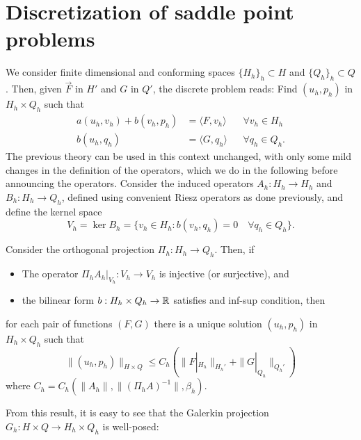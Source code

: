 \section{Discretization of saddle point problems}\label{sec:discretization-saddle-point}
We consider finite dimensional and conforming spaces $\{H_h\}_h \subset H$ and $\{Q_h\}_h \subset Q$. Then, given $\vec F$ in $H'$ and $G$ in $Q'$, the discrete problem reads: Find $(u_h, p_h)$ in $H_h \times Q_h$ such that 
\begin{equation}
    \begin{aligned}
        a(u_h, v_h) + b(v_h, p_h) &= \langle F, v_h\rangle &&\forall v_h \in H_h \\
        b(u_h, q_h)  &= \langle G, q_h\rangle &&\forall q_h \in Q_h. 
    \end{aligned}
\end{equation}
The previous theory can be used in this context unchanged, with only some mild changes in the definition of the operators, which we do in the following before announcing the operators. Consider the induced operators $A_h:H_h\to H_h$ and $B_h: H_h\to Q_h$, defined using convenient Riesz operators as done previously, and define the kernel space 
\begin{equation}
    V_h = \ker B_h = \{v_h \in H_h: b(v_h, q_h) = 0 \quad\forall q_h \in Q_h\}.
\end{equation}
\begin{theorem}\label{thm:uniqueness-mixed} 
    Consider the orthogonal projection $\Pi_h: H_h \to Q_h$. Then, if 
    \begin{itemize}
        \item The operator $\Pi_h A_h|_{V_h}: V_h\to V_h$ is injective (or surjective), and
        \item the bilinear form $b:H_h\times Q_h\to \mathbb{R}$ satisfies and inf-sup condition, then
    \end{itemize}
    for each pair of functions $(F, G)$ there is a unique solution $(u_h, p_h)$ in $H_h\times Q_h$ such that 
    \begin{equation}
        \| (u_h, p_h) \|_{H\times Q} \leq C_h\left( \|F|_{H_h}\|_{H_h'} + \| G|_{Q_h} \|_{Q_h'} \right)
    \end{equation}
    where $C_h = C_h(\| A_h\|, \| (\Pi_h A)^{-1} \|, \beta_h)$. 
    \end{theorem}
    From this result, it is easy to see that the Galerkin projection $G_h: H\times Q \to H_h\times Q_h$ is well-posed: 
